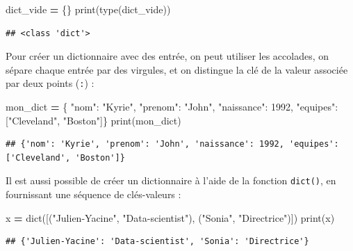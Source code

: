 \documentclass[
  12pt,
]{book}
\newenvironment{Shaded}{\begin{snugshade}}{\end{snugshade}}
\newcommand{\BuiltInTok}[1]{#1}
\newcommand{\DecValTok}[1]{\textcolor[rgb]{0.00,0.00,0.81}{#1}}
\newcommand{\NormalTok}[1]{#1}
\newcommand{\OperatorTok}[1]{\textcolor[rgb]{0.81,0.36,0.00}{\textbf{#1}}}
\newcommand{\StringTok}[1]{\textcolor[rgb]{0.31,0.60,0.02}{#1}}
\numberwithin{equation}{section}
\numberwithin{countremarque}{section}
\begin{document}
\begin{Shaded}
\begin{Highlighting}[]
\NormalTok{dict\_vide }\OperatorTok{=}\NormalTok{ \{\}}
\BuiltInTok{print}\NormalTok{(}\BuiltInTok{type}\NormalTok{(dict\_vide))}
\end{Highlighting}
\end{Shaded}

\begin{lstlisting}
## <class 'dict'>
\end{lstlisting}

Pour créer un dictionnaire avec des entrée, on peut utiliser les accolades, on sépare chaque entrée par des virgules, et on distingue la clé de la valeur associée par deux points (\texttt{:}) :

\begin{Shaded}
\begin{Highlighting}[]
\NormalTok{mon\_dict }\OperatorTok{=}\NormalTok{ \{ }\StringTok{"nom"}\NormalTok{: }\StringTok{"Kyrie"}\NormalTok{,}
  \StringTok{"prenom"}\NormalTok{: }\StringTok{"John"}\NormalTok{,}
  \StringTok{"naissance"}\NormalTok{: }\DecValTok{1992}\NormalTok{,}
  \StringTok{"equipes"}\NormalTok{: [}\StringTok{"Cleveland"}\NormalTok{, }\StringTok{"Boston"}\NormalTok{]\}}
\BuiltInTok{print}\NormalTok{(mon\_dict)}
\end{Highlighting}
\end{Shaded}

\begin{lstlisting}
## {'nom': 'Kyrie', 'prenom': 'John', 'naissance': 1992, 'equipes': ['Cleveland', 'Boston']}
\end{lstlisting}

Il est aussi possible de créer un dictionnaire à l'aide de la fonction \texttt{dict()}, en fournissant une séquence de clés-valeurs :

\begin{Shaded}
\begin{Highlighting}[]
\NormalTok{x }\OperatorTok{=} \BuiltInTok{dict}\NormalTok{([(}\StringTok{"Julien{-}Yacine"}\NormalTok{, }\StringTok{"Data{-}scientist"}\NormalTok{),}
\NormalTok{  (}\StringTok{"Sonia"}\NormalTok{, }\StringTok{"Directrice"}\NormalTok{)])}
\BuiltInTok{print}\NormalTok{(x)}
\end{Highlighting}
\end{Shaded}

\begin{lstlisting}
## {'Julien-Yacine': 'Data-scientist', 'Sonia': 'Directrice'}
\end{lstlisting}
\end{document}
